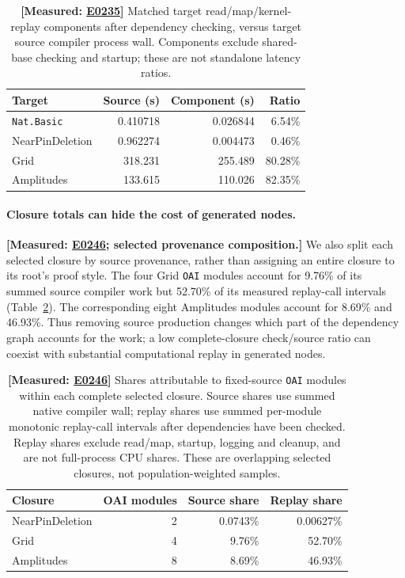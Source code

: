 \documentclass[10pt,twocolumn]{article}
\newcommand{\measured}[1]{\textbf{[Measured: #1]}}
\newcommand{\expref}[2]{\href{https://github.com/yunwei37/proofserve/blob/main/docs/tmp/build-and-evaluate/step-#1/step-report.md}{E#2}}
\begin{document}
\begin{table}[t]
\centering\small\setlength{\tabcolsep}{3pt}
\begin{tabular}{lrrr}
\toprule
Target & Source (s) & Component (s) & Ratio\\
\midrule
\texttt{Nat.Basic} &0.410718&0.026844&6.54\%\\
NearPinDeletion &0.962274&0.004473&0.46\%\\
Grid &318.231&255.489&80.28\%\\
Amplitudes &133.615&110.026&82.35\%\\
\bottomrule
\end{tabular}
\caption{\measured{\expref{0235-20261101T041713+0000}{0235}} Matched target read/map/kernel-replay components after dependency
checking, versus target source compiler process wall. Components exclude
shared-base checking and startup; these are not standalone latency ratios.}
\label{tab:components}
\end{table}

\paragraph{Closure totals can hide the cost of generated nodes.}
\measured{\expref{0246-20261101T121151+0000}{0246}; selected provenance composition.}
We also split each selected closure by source provenance, rather than
assigning an entire closure to its root's proof style.
The four Grid \texttt{OAI} modules account for 9.76\% of its summed source
compiler work but 52.70\% of its measured replay-call intervals
(Table~\ref{tab:namespacecost}).
The corresponding eight Amplitudes modules account for 8.69\% and 46.93\%.
Thus removing source production changes which part of the dependency
graph accounts for the work; a low complete-closure check/source ratio
can coexist with substantial computational replay in generated nodes.

\begin{table}[t]
\centering\small\setlength{\tabcolsep}{2pt}
\begin{tabular}{lrrr}
\toprule
Closure & OAI modules & Source share & Replay share\\
\midrule
NearPinDeletion &2&0.0743\%&0.00627\%\\
Grid &4&9.76\%&52.70\%\\
Amplitudes &8&8.69\%&46.93\%\\
\bottomrule
\end{tabular}
\caption{\measured{\expref{0246-20261101T121151+0000}{0246}} Shares attributable to fixed-source \texttt{OAI} modules within
each complete selected closure. Source shares use summed native compiler
wall; replay shares use summed per-module monotonic replay-call intervals
after dependencies have been checked. Replay shares exclude read/map,
startup, logging and cleanup, and are not full-process CPU shares.
These are overlapping selected closures, not population-weighted samples.}
\label{tab:namespacecost}
\end{table}
\end{document}

